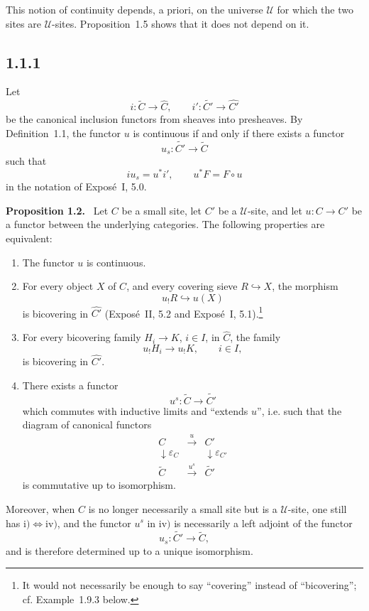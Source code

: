 \documentclass[11pt]{article}
\newcommand{\U}{\mathcal{U}}
\newenvironment{statement}[1]{\par\medskip\noindent\textbf{#1.}\ }{\par\medskip}
\begin{document}
This notion of continuity depends, a priori, on the universe \(\U\) for which the two sites are \(\U\)-sites. Proposition~1.5 shows that it does not depend on it.

\subsection*{1.1.1}
Let
\[
i:\widetilde C\longrightarrow \widehat C,
\qquad
 i':\widetilde {C'}\longrightarrow \widehat {C'}
\]
be the canonical inclusion functors from sheaves into presheaves. By Definition~1.1, the functor \(u\) is continuous if and only if there exists a functor
\[
u_s:\widetilde {C'}\longrightarrow \widetilde C
\]
such that
\[
 i u_s=u^* i',\qquad u^*F=F\circ u
\]
in the notation of Expos\'e~I, 5.0.

\begin{statement}{Proposition 1.2}
Let \(C\) be a small site, let \(C'\) be a \(\U\)-site, and let \(u:C\to C'\) be a functor between the underlying categories. The following properties are equivalent:
\begin{enumerate}[label=\roman*)]
\item The functor \(u\) is continuous.

\item For every object \(X\) of \(C\), and every covering sieve \(R\hookrightarrow X\), the morphism
\[
u_!R\hookrightarrow u(X)
\]
is bicovering in \(\widehat {C'}\) (Expos\'e~II, 5.2 and Expos\'e~I, 5.1).\footnote{It would not necessarily be enough to say ``covering'' instead of ``bicov\-ering''; cf. Example~1.9.3 below.}

\item For every bicovering family \(H_i\to K\), \(i\in I\), in \(\widehat C\), the family
\[
u_!H_i\longrightarrow u_!K,
\qquad i\in I,
\]
is bicovering in \(\widehat {C'}\).

\item There exists a functor
\[
u^s:\widetilde C\longrightarrow \widetilde {C'}
\]
which commutes with inductive limits and ``extends \(u\)'', i.e. such that the diagram of canonical functors
\[
\begin{array}{ccc}
C&\xrightarrow{\ u\ }&C'\\
\downarrow{\scriptstyle\varepsilon_C}&&\downarrow{\scriptstyle\varepsilon_{C'}}\\
\widetilde C&\xrightarrow{\ u^s\ }&\widetilde {C'}
\end{array}
\]
is commutative up to isomorphism.
\end{enumerate}
Moreover, when \(C\) is no longer necessarily a small site but is a \(\U\)-site, one still has \(\mathrm{i)}\Leftrightarrow\mathrm{iv)}\), and the functor \(u^s\) in \(\mathrm{iv)}\) is necessarily a left adjoint of the functor
\[
u_s:\widetilde {C'}\longrightarrow \widetilde C,
\]
and is therefore determined up to a unique isomorphism.
\end{statement}
\end{document}
